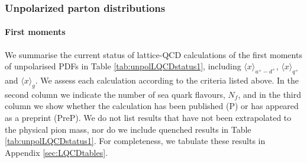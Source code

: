 \subsubsection{Unpolarized parton distributions}

\paragraph{First moments}
%
We summarise the current status of lattice-QCD calculations of the first moments of unpolarised PDFs
in Table \ref{tab:unpolLQCDstatus1}, including $\langle x\rangle_{u^+-d^+}$, $\langle x\rangle_{q^+}$ and
$\langle x\rangle_{g}$. We assess each calculation according 
to the criteria listed above. In the second column we indicate the number of sea quark flavours, $N_f$, and
in the third column we show whether the calculation has been published (P) or has appeared as a preprint (PreP).
We do not list results that have not been extrapolated to the physical pion mass, nor do we include 
quenched results in Table \ref{tab:unpolLQCDstatus1}. For completeness, we tabulate these results in Appendix 
\ref{sec:LQCDtables}.

